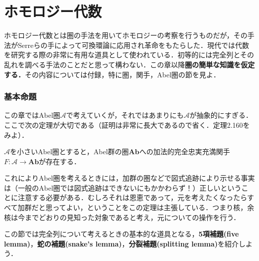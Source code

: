 \part[Homological algebra]{ホモロジー代数}
ホモロジー代数とは圏の手法を用いてホモロジーの考察を行うものだが，その手法がSerreらの手によって可換環論に応用され革命をもたらした．現代では代数を研究する際の非常に有用な道具として使われている．初等的には完全列とその乱れを調べる手法のことだと思って構わない．この章以降\textbf{圏の簡単な知識を仮定する．}その内容については付録，特に圏，関手，Abel圏の節を見よ．
\section{基本命題}

この章ではAbel圏$\mathscr{A}$で考えていくが，それではあまりにも$\mathscr{A}$が抽象的にすぎる．ここで次の定理が大切である（証明は非常に長大であるので省く．\cite{Shiho2016}定理2.160をみよ）．

\begin{thm}
	$\mathscr{A}$を小さいAbel圏とすると，Abel群の圏$\mathbf{Ab}$への加法的完全忠実充満関手$F:\mathscr{A}\to\mathbf{Ab}$が存在する．
\end{thm}

これによりAbel圏を考えるときには，加群の圏などで図式追跡により示せる事実は（一般のAbel圏では図式追跡はできないにもかかわらず！）正しいということに注意する必要がある．むしろそれは恩恵であって，元を考えたくなったらすべて加群だと思ってよい，ということをこの定理は主張している．つまり核，余核は今までどおりの見知った対象であると考え，元についての操作を行う．

この節では完全列について考えるときの基本的な道具となる，\textbf{5項補題(five lemma)}，\textbf{蛇の補題(snake's lemma)}，\textbf{分裂補題(splitting lemma)}を紹介しよう．

